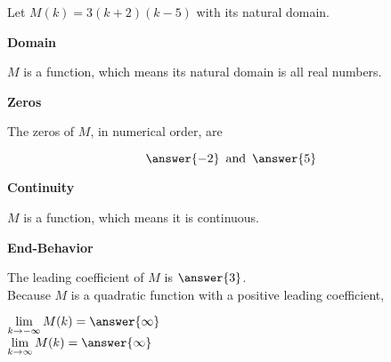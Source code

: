 \documentclass{ximera}
\author{Lee Wayand}
\begin{document}
\begin{exercise} 




Let $M(k) = 3(k+2)(k-5)$ with its natural domain. \\




\begin{question}  \textbf{\textcolor{blue!55!black}{Domain}}


$M$ is a  function, which means its natural domain is all real numbers.

\end{question}








\begin{question}  \textbf{\textcolor{blue!55!black}{Zeros}}


The zeros of $M$, in numerical order, are

\[
\answer{-2} \, \text{ and } \, \answer{5}
\]

\end{question}







\begin{question}  \textbf{\textcolor{blue!55!black}{Continuity}}


$M$ is a  function, which means it is continuous.

\end{question}









\begin{question}  \textbf{\textcolor{blue!55!black}{End-Behavior}}


The leading coefficient of $M$ is $\answer{3}$. \\


Because $M$ is a quadratic function with a positive leading coefficient,

$\lim\limits_{k \to -\infty} M(k) = \answer{\infty}$ \\


$\lim\limits_{k \to \infty} M(k) = \answer{\infty}$ \\


\end{question}
\end{exercise}
\end{document}
